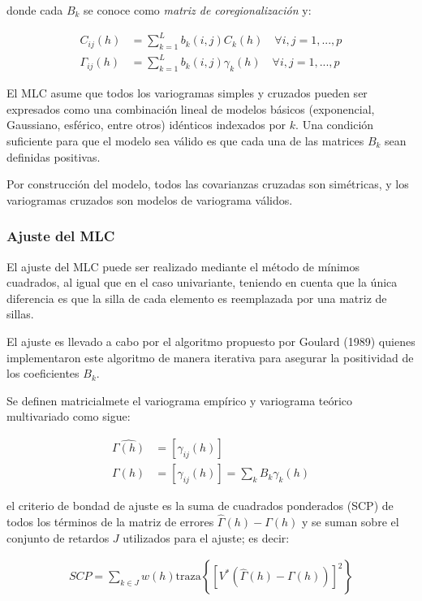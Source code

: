 \documentclass[
]{book}
\begin{document}
donde cada \(B_k\) se conoce como \textit{matriz de coregionalización} y:

\begin{align*}
    C_{ij}(h)&=\sum_{k=1}^Lb_k(i,j)C_k(h)\quad \forall i,j=1,...,p\\
    \Gamma_{ij}(h)&=\sum_{k=1}^Lb_k(i,j)\gamma_k(h)\quad \forall i,j=1,...,p
\end{align*}

El MLC asume que todos los variogramas simples y cruzados pueden ser expresados como una combinación lineal de modelos básicos (exponencial, Gaussiano, esférico, entre otros) idénticos indexados por \(k\). Una condición suficiente para que el modelo sea válido es que cada una de las matrices \(B_k\) sean definidas positivas.

Por construcción del modelo, todos las covarianzas cruzadas son simétricas, y los variogramas cruzados son modelos de variograma válidos.

\hypertarget{ajuste-del-mlc}{%
\subsubsection*{Ajuste del MLC}\label{ajuste-del-mlc}}

El ajuste del MLC puede ser realizado mediante el método de mínimos cuadrados, al igual que en el caso univariante, teniendo en cuenta que la única diferencia es que la silla de cada elemento es reemplazada por una matriz de sillas.

El ajuste es llevado a cabo por el algoritmo propuesto por Goulard (1989) quienes implementaron este algoritmo de manera iterativa para asegurar la positividad de los coeficientes \(B_k\).

Se definen matricialmete el variograma empírico y variograma teórico multivariado como sigue:

\begin{align*}
    \hat{\Gamma(h)}&=\left[\hat{\gamma}_{ij}(h)\right]\\
    \Gamma(h)&=\left[\gamma_{ij}(h)\right]=\sum_kB_k\gamma_k(h)
\end{align*}

el criterio de bondad de ajuste es la suma de cuadrados ponderados (SCP) de todos los términos de la matriz de errores \(\hat{\Gamma}(h)-\Gamma(h)\) y se suman sobre el conjunto de retardos \(J\) utilizados para el ajuste; es decir:

\begin{align*}
    SCP=\sum_{k\in J}w(h)\text{traza}\left\{ \left[V^{*}(\hat{\Gamma}(h)-\Gamma(h))\right]^2\right\}
\end{align*}
\end{document}
